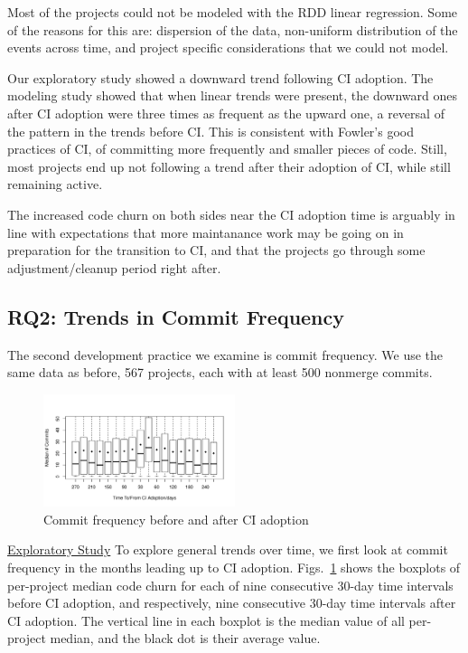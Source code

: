 \documentclass[conference]{IEEEtran}
\begin{document}
Most of the projects could not be modeled with the RDD linear regression.
Some of the reasons for this are: dispersion of the data,
non-uniform distribution of the events across time, and project specific considerations that we could not model.

Our exploratory study showed a downward trend following CI adoption.
The modeling study showed that when linear trends were present, the downward ones after CI adoption were three times as frequent as the upward one, a reversal of the pattern in the trends before CI.
This is consistent with Fowler's good practices of CI, of committing more frequently and smaller pieces of code.
Still, most projects end up not following a trend after their adoption of CI, while still remaining active.

The increased code churn on both sides near the CI adoption time is arguably in line with expectations that more maintanance work may be going on in preparation for the transition to CI, and that the projects go through some adjustment/cleanup period right after.


\subsection{RQ2: Trends in Commit Frequency}

The second development practice we examine is commit frequency.
We use the same data as before, 567 projects, each with at least 500 nonmerge commits.

\begin{figure}[!t]
\centering
\includegraphics[width=0.5\textwidth]{numbercommits.pdf}
\caption{Commit frequency before and after CI adoption}
\label{Fig:NumberCommits}
\end{figure}

\noindent \underline{Exploratory Study} To explore general trends over time, we first look at commit frequency in the months leading up to CI adoption.
Figs.~\ref{Fig:NumberCommits} shows the boxplots of per-project median code churn for each of nine consecutive 30-day time intervals before CI adoption, and respectively, nine consecutive 30-day time intervals after CI adoption.
The vertical line in each boxplot is the median value of all per-project median, and the black dot is their average value.
\end{document}
